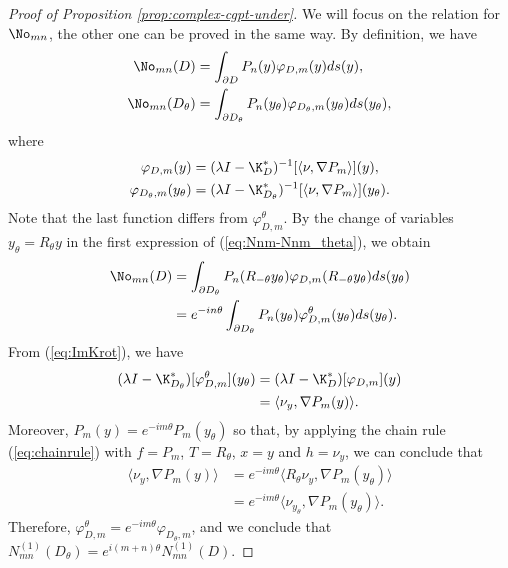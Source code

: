 \begin{proof}[Proof of Proposition \ref{prop:complex-cgpt-under}]
We will focus on the relation for $\No_{mn}$, the other one can be
proved in the same way. By definition, we have
\begin{equation}
\begin{aligned}
\No_{mn}(D) &= \int_{\partial D} P_n(y) \varphi_{D,m}(y) ds(y),\\
\No_{mn}(D_\theta) &= \int_{\partial D_\theta} P_n(y_\theta) \varphi_{D_\theta,m}(y_\theta) ds(y_\theta),\\
\end{aligned}
\label{eq:Nnm-Nnm_theta}
\end{equation}
where
\begin{equation*}
\begin{aligned}
\varphi_{D,m}(y) &= (\lambda I - \K^*_{D})^{-1} [\langle \nu, \nabla P_m \rangle](y), \\
\varphi_{D_\theta,m}(y_\theta) &= (\lambda I -
\K^*_{D_\theta})^{-1}[\langle \nu, \nabla P_m \rangle ](y_\theta).
\end{aligned}
\end{equation*}
Note that the last function differs from $\varphi^{\theta}_{D,m}$.
By the change of variables $y_\theta=R_{\theta} y$ in the first
expression of  (\ref{eq:Nnm-Nnm_theta}), we obtain
\begin{equation*}
\begin{aligned}
\No_{mn}(D) &= \int_{\partial D_\theta} P_n(R_{-\theta}y_\theta)
\varphi_{D,m}(R_{-\theta}y_\theta)
ds(y_\theta)\\
&= e^{-i n\theta}\int_{\partial D_\theta} P_n(y_\theta) \varphi^{\theta}_{D,m}(y_\theta) ds(y_\theta).\\
\end{aligned}
\end{equation*}
From (\ref{eq:ImKrot}), we have
\begin{equation*}
\begin{aligned}
(\lambda I - \K^*_{D_\theta})[\varphi^\theta_{D,m}](y_\theta) &= (\lambda I - \K^*_{D})[\varphi_{D,m}](y)\\
&= \langle \nu_y, \nabla P_m(y) \rangle.
\end{aligned}
\end{equation*}
Moreover, $P_m(y)=e^{-im\theta}P_m(y_\theta)$ so that, by applying
the chain rule (\ref{eq:chainrule}) with $f=P_m$, $T=R_\theta$,
$x=y$ and $h=\nu_y$, we can conclude that
\begin{equation*}
\begin{aligned}
\langle \nu_y,\nabla P_m(y) \rangle &= e^{-im\theta}\langle R_\theta\nu_y, \nabla P_m(y_\theta) \rangle \\
&= e^{-im\theta}\langle \nu_{y_\theta}, \nabla P_m(y_\theta)
\rangle.
\end{aligned}
\end{equation*}
Therefore,
$\varphi^\theta_{D,m}=e^{-im\theta}\varphi_{D_\theta,m}$, and we
conclude that
$N_{mn}^{(1)}(D_\theta)=e^{i(m+n)\theta}N_{mn}^{(1)}(D)$.


\end{proof}

